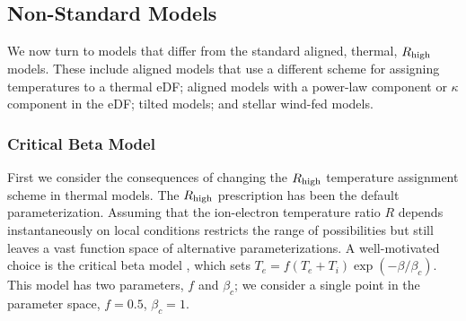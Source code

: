 


\subsection{Non-Standard Models}

We now turn to models that differ from the standard aligned, thermal, $R_\mathrm{high}$ models.  These include aligned models that use a different scheme for assigning temperatures to a thermal eDF; aligned models with a power-law component or $\kappa$ component in the eDF; tilted models; and stellar wind-fed models.

\subsubsection{Critical Beta Model}

First we consider the consequences of changing the $R_\mathrm{high}$ temperature assignment scheme in thermal models.  The $R_\mathrm{high}$ prescription has been the default parameterization.  Assuming that the ion-electron temperature ratio $R$ depends instantaneously on local conditions restricts the range of possibilities but still leaves a vast function space of alternative parameterizations.  A well-motivated choice is the critical beta model \citep{2020MNRAS.493.1404A}, which sets $T_e = f (T_e + T_i) \exp(-\beta/\beta_c)$.  This model has two parameters, $f$ and $\beta_c$; we consider a single point in the parameter space, $f = 0.5$, $\beta_c = 1$.

